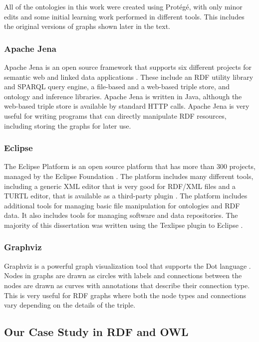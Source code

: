 All of the ontologies in this work were created using Prot\'eg\'e, with only
minor edits and some initial learning work performed in different tools. This
includes the original versions of graphs shown later in the text.

\subsubsection{Apache Jena}

Apache Jena is an open source framework that supports six different projects for
semantic web and linked data applications \cite{apache-jena}. These include an
RDF utility library and SPARQL query engine, a file-based and a web-based
triple store, and ontology and inference libraries. Apache Jena is written in
Java, although the web-based triple store is available by standard HTTP calls. 
Apache Jena is very useful for writing programs that can directly manipulate
RDF resources, including storing the graphs for later use.

\subsubsection{Eclipse}

The Eclipse Platform is an open source platform that has more than 300
projects, managed by the Eclipse Foundation \cite{eclipse}. The
platform includes many different tools, including a generic XML editor
that is very good for RDF/XML files and a TURTL editor, that is available as a
third-party plugin \cite{xturtl}. The platform includes additional tools for
managing basic file manipulation for ontologies and RDF data. It also includes
tools for managing software and data repositories. The majority of this
dissertation was written using the Texlipse plugin to Eclipse \cite{texlipse}.

\subsubsection{Graphviz}

Graphviz is a powerful graph visualization tool that supports the Dot language
\cite{graphviz}. Nodes in graphs are drawn as circles with labels and
connections between the nodes are drawn as curves with annotations that describe
their connection type. This is very useful for RDF graphs where both the node
types and connections vary depending on the details of the triple.

\subsection{Our Case Study in RDF and OWL}

